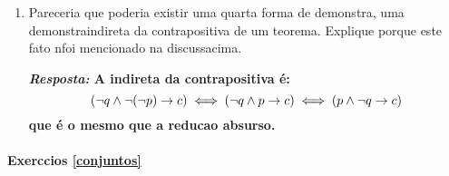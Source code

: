 \begin{enumerate}[{\bf 1.}]
\item Pareceria que poderia existir uma quarta forma de demonstra\caoi, uma demonstra\cao indireta da contrapositiva de um teorema. Explique porque este fato n\ao foi mencionado na discuss\ao acima.

{\bf{\it Resposta:} A indireta da contrapositiva \'e:
\[
(\lnot q \wedge \lnot(\lnot p)\to c) \iff (\lnot q \wedge p\to c) \iff (p \wedge \lnot q\to c)
\]
que \'e o mesmo que a reduc\ao ao absurso.
}
\end{enumerate}
\paragraph{Exerc\ih cios \ref{conjuntos}}

